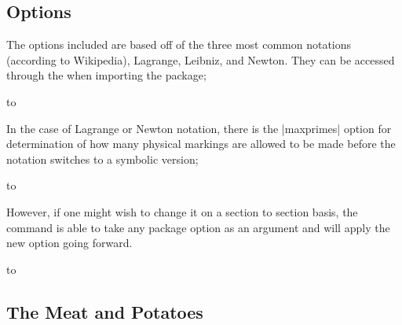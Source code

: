 \documentclass[11pt,a4paper]{ltxdoc}
\begin{document}
\subsection{Options}

The options included are based off of the three most
common notations
(according to Wikipedia), Lagrange, Leibniz, and Newton. 
They can be accessed through the  when importing the package;
\par\hbox to 

In the case of Lagrange or Newton notation, there is the |maxprimes| option
for determination of how many physical markings are allowed to be
made before the notation switches to a symbolic version;
\par\hbox to 
\vspace{1ex}


\DescribeMacro{\setDE}
However, if one might wish to change it on a section to section basis,
the command  is able
to take any package option as an argument and will
apply the new option going forward.
\vspace{1ex}
\par\hbox to 



\subsection{The Meat and Potatoes}
\end{document}
